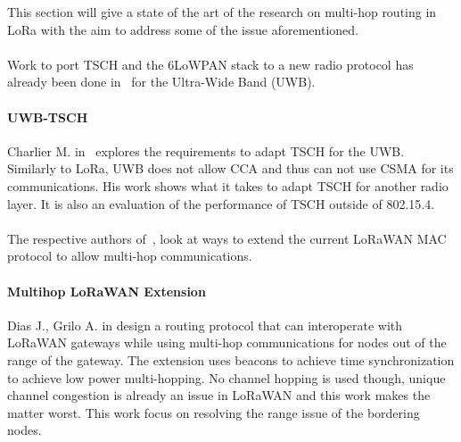 This section will give a state of the art of the research on
multi-hop routing in LoRa with the aim to address some of the issue
aforementioned.

\paragraph{}

Work to port TSCH and the 6LoWPAN stack to a new radio protocol has already
been done in~\cite{uwbtsch} for the Ultra-Wide Band (UWB).

\paragraph{UWB-TSCH}

Charlier M. in~\cite{uwbtsch} explores the requirements to adapt TSCH for the UWB.
Similarly to LoRa, UWB does not allow CCA and thus can not use CSMA for its
communications.
His work shows what it takes to adapt TSCH for another radio layer.
It is also an evaluation of the performance of TSCH outside of 802.15.4.

\paragraph{}

The respective authors of~\cite{DIAS2018424, 8856256}, look at ways to extend
the current LoRaWAN MAC protocol to allow multi-hop communications.

\paragraph{Multihop LoRaWAN Extension} Dias J., Grilo A. in \cite{DIAS2018424}
design a routing protocol that can interoperate with LoRaWAN gateways while
using multi-hop communications for nodes out of the range of the gateway.
The extension uses beacons to achieve time synchronization to achieve low power
multi-hopping.
No channel hopping is used though, unique channel congestion is already an issue
in LoRaWAN and this work makes the matter worst.
This work focus on resolving the range issue of the bordering nodes.


